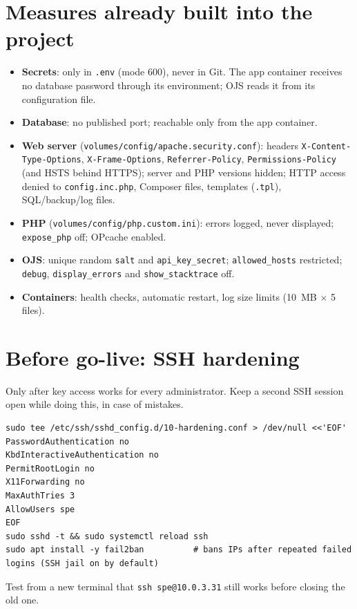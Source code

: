 \documentclass[11pt,a4paper]{report}
\newcommand{\code}[1]{\texttt{\small #1}}
\newcommand{\file}[1]{\texttt{\small #1}}
\begin{document}
\section{Measures already built into the project}
\begin{itemize}
  \item \textbf{Secrets}: only in \file{.env} (mode 600), never in Git. The app container receives no
        database password through its environment; OJS reads it from its configuration file.
  \item \textbf{Database}: no published port; reachable only from the app container.
  \item \textbf{Web server} (\file{volumes/config/apache.security.conf}): headers
        \code{X-Content-Type-Options}, \code{X-Frame-Options}, \code{Referrer-Policy},
        \code{Permissions-Policy} (and HSTS behind HTTPS); server and PHP versions hidden;
        HTTP access denied to \file{config.inc.php}, Composer files, templates (\file{.tpl}),
        SQL/backup/log files.
  \item \textbf{PHP} (\file{volumes/config/php.custom.ini}): errors logged, never displayed;
        \code{expose\_php} off; OPcache enabled.
  \item \textbf{OJS}: unique random \code{salt} and \code{api\_key\_secret}; \code{allowed\_hosts}
        restricted; \code{debug}, \code{display\_errors} and \code{show\_stacktrace} off.
  \item \textbf{Containers}: health checks, automatic restart, log size limits (10~MB $\times$ 5 files).
\end{itemize}

\section{Before go-live: SSH hardening}\label{sec:sshhardening}
Only after key access works for every administrator. Keep a second SSH session open while
doing this, in case of mistakes.
\begin{lstlisting}
sudo tee /etc/ssh/sshd_config.d/10-hardening.conf > /dev/null <<'EOF'
PasswordAuthentication no
KbdInteractiveAuthentication no
PermitRootLogin no
X11Forwarding no
MaxAuthTries 3
AllowUsers spe
EOF
sudo sshd -t && sudo systemctl reload ssh
sudo apt install -y fail2ban          # bans IPs after repeated failed logins (SSH jail on by default)
\end{lstlisting}
Test from a new terminal that \code{ssh spe@10.0.3.31} still works before closing the old one.
\end{document}

